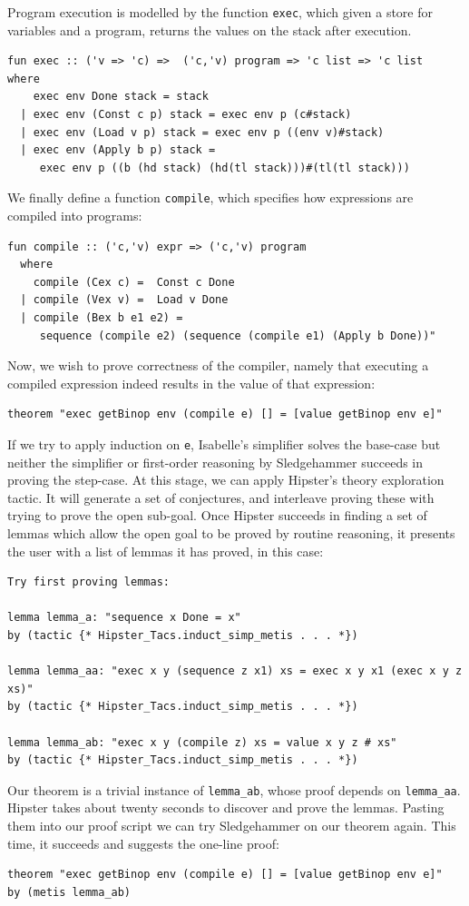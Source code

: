 Program execution is modelled by the function \texttt{exec}, which given a store for variables and a program, returns the values on the stack after execution.
\begin{small}
\begin{verbatim}
fun exec :: ('v => 'c) =>  ('c,'v) program => 'c list => 'c list
where
    exec env Done stack = stack
  | exec env (Const c p) stack = exec env p (c#stack)
  | exec env (Load v p) stack = exec env p ((env v)#stack)
  | exec env (Apply b p) stack =
     exec env p ((b (hd stack) (hd(tl stack)))#(tl(tl stack)))
\end{verbatim}
\end{small}
We finally define a function \texttt{compile}, which specifies how expressions are compiled into programs:
\begin{small}
\begin{verbatim}
fun compile :: ('c,'v) expr => ('c,'v) program
  where
    compile (Cex c) =  Const c Done
  | compile (Vex v) =  Load v Done
  | compile (Bex b e1 e2) =
     sequence (compile e2) (sequence (compile e1) (Apply b Done))"
\end{verbatim}
\end{small}
Now, we wish to prove correctness of the compiler, namely that executing a compiled expression indeed results in the value of that expression: 
\begin{verbatim}
theorem "exec getBinop env (compile e) [] = [value getBinop env e]"
\end{verbatim}
If we try to apply induction on \texttt{e}, Isabelle's simplifier solves the base-case but neither the simplifier or first-order reasoning by Sledgehammer succeeds in proving the step-case. At this stage, we can apply Hipster's theory exploration tactic. It will generate a set of conjectures, and interleave proving these with trying to prove the open sub-goal. Once Hipster succeeds in finding a set of lemmas which allow the open goal to be proved by routine reasoning, it presents the user with a list of lemmas it has proved, in this case:
\begin{small}
\begin{verbatim}
Try first proving lemmas:

lemma lemma_a: "sequence x Done = x"
by (tactic {* Hipster_Tacs.induct_simp_metis . . . *})

lemma lemma_aa: "exec x y (sequence z x1) xs = exec x y x1 (exec x y z xs)"
by (tactic {* Hipster_Tacs.induct_simp_metis . . . *})

lemma lemma_ab: "exec x y (compile z) xs = value x y z # xs"
by (tactic {* Hipster_Tacs.induct_simp_metis . . . *})
\end{verbatim}
\end{small}
Our theorem is a trivial instance of \verb|lemma_ab|, whose proof
depends on \verb|lemma_aa|. Hipster takes about twenty seconds to
discover and prove the lemmas.
Pasting them into our proof script we can try Sledgehammer on our theorem again. This time, it succeeds and suggests the one-line proof:%
\begin{verbatim}
theorem "exec getBinop env (compile e) [] = [value getBinop env e]"
by (metis lemma_ab)
\end{verbatim}
